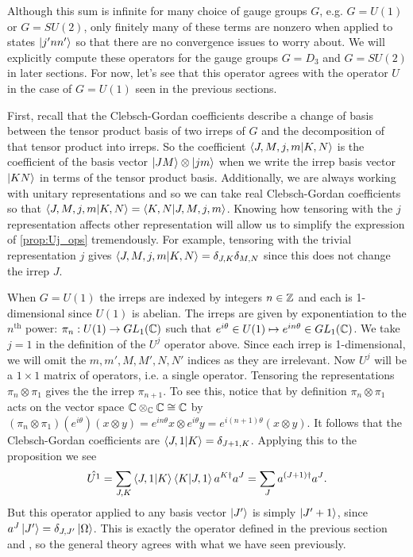 \documentclass[11pt,reqno]{amsart}
\numberwithin{equation}{section}
\begin{document}
	Although this sum is infinite for many choice of gauge groups $G$, e.g. $G=U(1)$ or $G=SU(2)$, only finitely many of these terms are nonzero when applied to states $\ket{j'nn'}$ so that there are no convergence issues to worry about.
	We will explicitly compute these operators for the gauge groups $G=D_3$ and $G=SU(2)$ in later sections.
	For now, let's see that this operator agrees with the operator $U$ in the case of $G=U(1)$ seen in the previous sections.
	
	First, recall that the Clebsch-Gordan coefficients describe a change of basis between the tensor product basis of two irreps of $G$ and the decomposition of that tensor product into irreps.
	So the coefficient $\braket{J,M,j,m}{K,N}$ is the coefficient of the basis vector $\ket{JM}\otimes \ket{jm}$ when we write the irrep basis vector $\ket{KN}$ in terms of the tensor product basis.
	Additionally, we are always working with unitary representations and so we can take real Clebsch-Gordan coefficients so that $\braket{J,M,j,m}{K,N}=\braket{K,N}{J,M,j,m}$.
	Knowing how tensoring with the $j$ representation affects other representation will allow us to simplify the expression of \cref{prop:Uj_ops} tremendously.
	For example, tensoring with the trivial representation $j$ gives $\braket{J,M,j,m}{K,N}=\delta_{J,K}\delta_{M,N}$ since this does not change the irrep $J$.
	
	When $G=U(1)$ the irreps are indexed by integers $n\in\mathbb{Z}$ and each is 1-dimensional since $U(1)$ is abelian. 
	The irreps are given by exponentiation to the $n^\text{th}$ power: $\pi_n: U(1) \to GL_1(\mathbb{C})$ such that $e^{i\theta} \in U(1) \mapsto e^{in\theta} \in GL_1(\mathbb{C})$.
	We take $j=1$ in the definition of the $U^j$ operator above. 
	Since each irrep is 1-dimensional, we will omit the $m,m',M,M',N,N'$ indices as they are irrelevant. 
	Now $U^j$ will be a $1\times 1$ matrix of operators, i.e. a single operator.
	Tensoring the representations $\pi_n \otimes \pi_1$ gives the the irrep $\pi_{n+1}$. 
	To see this, notice that by definition $\pi_n \otimes \pi_1$ acts on the vector space $\mathbb{C} \otimes_{\mathbb{C}} \mathbb{C} \cong \mathbb{C}$ by  $(\pi_n\otimes\pi_1)(e^{i\theta})(x\otimes y)=e^{in\theta}x\otimes e^{i\theta}y=e^{i(n+1)\theta}(x\otimes y).$
	It follows that the Clebsch-Gordan coefficients are $\braket{J,1}{K}=\delta_{J+1,K}$.
	Applying this to the proposition we see
	\begin{equation}
		\hat{U^1}=\sum_{J,K} \braket{J,1}{K}\braket{K}{J,1} a^{K\dagger} a^J = \sum_{J} a^{(J+1)\dagger} a^J.
	\end{equation}
	But this operator applied to any basis vector $\ket{J'}$ is simply $\ket{J'+1}$, since $a^J\ket{J'}=\delta_{J,J'}\ket{\Omega}$.
	This is exactly the operator defined in the previous section and \cite{Hamer82}, so the general theory agrees with what we have seen previously.
	
\end{document}
